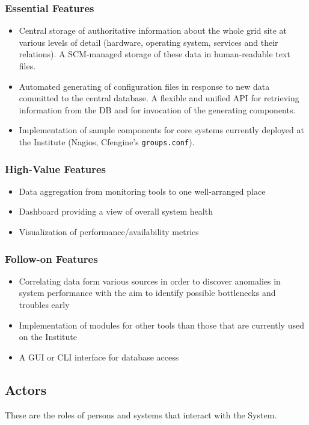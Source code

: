 \documentclass[12pt]{article}
\begin{document}
\subsubsection{Essential Features}
\begin{itemize}
	\item Central storage of authoritative information about the whole grid site
        at various levels of detail (hardware, operating system, services and
        their relations).  A SCM-managed storage of these data in human-readable
        text files.
	\item Automated generating of configuration files in response to new data
        committed to the central database.  A flexible and unified API for
        retrieving information from the DB and for invocation of the generating
        components.
  \item Implementation of sample components for core systems currently
        deployed at the Institute (Nagios, Cfengine's {\tt groups.conf}).
\end{itemize}

\subsubsection{High-Value Features}
\begin{itemize}
	  \item Data aggregation from monitoring tools to one well-arranged place
    \item Dashboard providing a view of overall system health
    \item Visualization of performance/availability metrics
\end{itemize}

\subsubsection{Follow-on Features}
\begin{itemize}
    \item Correlating data form various sources in order to discover anomalies
        in system performance with the aim to identify possible bottlenecks and
        troubles early
	  \item Implementation of modules for other tools than those that are currently used on the Institute
    \item A GUI or CLI interface for database access
\end{itemize}

\subsection{Actors}
These are the roles of persons and systems that interact with the System.
\end{document}
